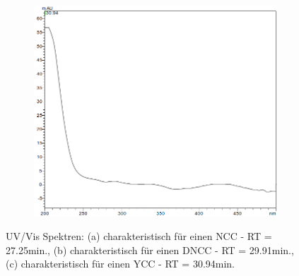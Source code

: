 \begin{figure}[!htbp]
  \begin{subfigure}[b]{0.5\textwidth}
    \includegraphics[width=\textwidth]{figures/Kapitel6/keineReaktion/YCC3094.png}
    \caption{}
    \label{fig:DNCC2991}
  \end{subfigure}
  \caption[UV/Vis Spektren mit der Charakteristik eines NCC bei 27.25min. und der Charakteristik eines DNCC bei 29.91min., Quelle: Author]{UV/Vis Spektren: (a) charakteristisch für einen \gls{NCC} - RT = 27.25min., (b) charakteristisch für einen \gls{DNCC} - RT = 29.91min., (c) charakteristisch für einen \gls{YCC} - RT = 30.94min.}
\end{figure}
